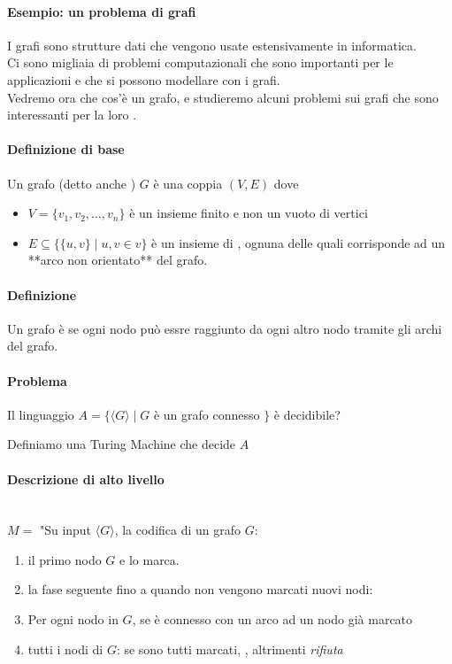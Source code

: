 \paragraph{Esempio: un problema di grafi}
I grafi sono strutture dati che vengono usate estensivamente in informatica.\\
Ci sono migliaia di problemi computazionali che sono importanti per le applicazioni e che si possono modellare con i grafi.\\
Vedremo ora che cos'è un grafo, e studieremo alcuni problemi sui grafi che sono interessanti per la loro .

\paragraph{Definizione di base}
Un grafo  (detto anche ) $G$ è una coppia $(V,E)$ dove
\begin{itemize}
	\item $V = \{v_1, v_2,\dots,v_n\}$ è un insieme finito e non un vuoto di vertici
	\item $E\subseteq \Big\{\{u,v\}\mid u,v\in v\Big\}$ è un insieme di ,
		ognuna delle quali corrisponde ad un **arco non orientato** del grafo. 
\end{itemize}
\paragraph{Definizione}
	Un grafo è  se ogni nodo può essre raggiunto da ogni altro nodo tramite gli archi del grafo. 

\paragraph{Problema }
Il linguaggio $A=\{\langle G\rangle\mid G$ è un grafo connesso $\}$ è decidibile? 

Definiamo una Turing Machine che decide $A$ 

\paragraph{Descrizione di alto livello}\nin\\
$M =$ "Su input $\langle G\rangle$, la codifica di un grafo $G$: 
\begin{enumerate}
	\item {} il primo nodo $G$ e lo marca.
	\item  {} la fase seguente fino a quando non vengono marcati nuovi nodi: 
	\item  Per ogni nodo in $G$,  se è connesso con un arco ad un nodo già marcato
	\item  {} tutti i nodi di $G$:  se sono tutti marcati, , altrimenti \textit{rifiuta}
\end{enumerate}

